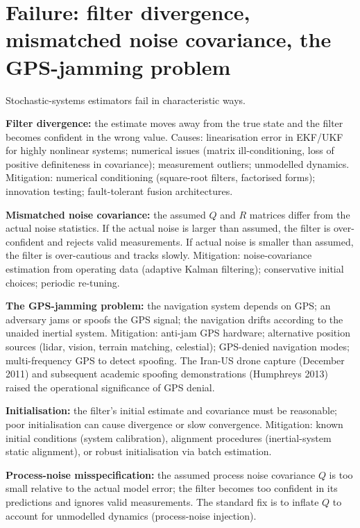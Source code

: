 \section{Failure: filter divergence, mismatched noise covariance, the GPS-jamming problem}

Stochastic-systems estimators fail in characteristic ways.

\textbf{Filter divergence:} the estimate moves away from the true state and the filter becomes confident in the wrong value. Causes: linearisation error in EKF/UKF for highly nonlinear systems; numerical issues (matrix ill-conditioning, loss of positive definiteness in covariance); measurement outliers; unmodelled dynamics. Mitigation: numerical conditioning (square-root filters, factorised forms); innovation testing; fault-tolerant fusion architectures.

\textbf{Mismatched noise covariance:} the assumed $Q$ and $R$ matrices differ from the actual noise statistics. If the actual noise is larger than assumed, the filter is over-confident and rejects valid measurements. If actual noise is smaller than assumed, the filter is over-cautious and tracks slowly. Mitigation: noise-covariance estimation from operating data (adaptive Kalman filtering); conservative initial choices; periodic re-tuning.

\textbf{The GPS-jamming problem:} the navigation system depends on GPS; an adversary jams or spoofs the GPS signal; the navigation drifts according to the unaided inertial system. Mitigation: anti-jam GPS hardware; alternative position sources (lidar, vision, terrain matching, celestial); GPS-denied navigation modes; multi-frequency GPS to detect spoofing. The Iran-US drone capture (December 2011) and subsequent academic spoofing demonstrations (Humphreys 2013) raised the operational significance of GPS denial.

\textbf{Initialisation:} the filter's initial estimate and covariance must be reasonable; poor initialisation can cause divergence or slow convergence. Mitigation: known initial conditions (system calibration), alignment procedures (inertial-system static alignment), or robust initialisation via batch estimation.

\textbf{Process-noise misspecification:} the assumed process noise covariance $Q$ is too small relative to the actual model error; the filter becomes too confident in its predictions and ignores valid measurements. The standard fix is to inflate $Q$ to account for unmodelled dynamics (process-noise injection).

